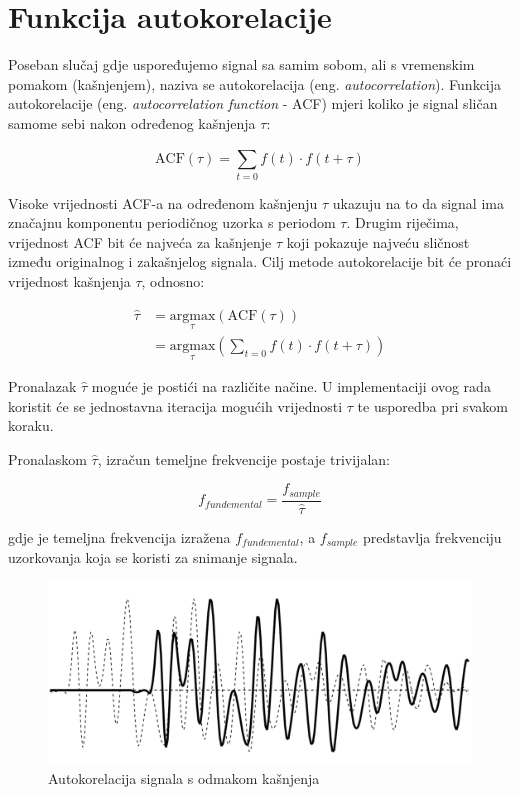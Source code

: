 \documentclass[times, utf8, diplomski, numeric]{fer}
\begin{document}
\section{Funkcija autokorelacije}
Poseban slučaj gdje uspoređujemo signal sa samim sobom, ali s vremenskim pomakom (kašnjenjem), naziva se autokorelacija (eng. \textit{autocorrelation}). Funkcija autokorelacije (eng. \textit{autocorrelation function} - ACF) mjeri koliko je signal sličan samome sebi nakon određenog kašnjenja $\tau$:

\begin{equation}
	\mathrm{ACF}(\tau) = \sum_{t = 0}^{} {f(t) \cdot f(t + \tau)}
\end{equation}

Visoke vrijednosti ACF-a na određenom kašnjenju $\tau$ ukazuju na to da signal ima značajnu komponentu periodičnog uzorka s periodom $\tau$. Drugim riječima, vrijednost ACF bit će najveća za kašnjenje $\tau$ koji pokazuje najveću sličnost između originalnog i zakašnjelog signala. Cilj metode autokorelacije bit će pronaći vrijednost kašnjenja $\tau$, odnosno:

\begin{equation}
	\begin{split}
		\hat{\tau} &= \underset{\tau}{\mathrm{argmax}} (\mathrm{ACF}(\tau)) \\
		&= \underset{\tau}{\mathrm{argmax}} (\sum_{t = 0}^{} {f(t) \cdot f(t + \tau)})
	\end{split}
\end{equation}

Pronalazak $\hat{\tau}$ moguće je postići na različite načine. U implementaciji ovog rada koristit će se jednostavna iteracija mogućih vrijednosti $\tau$ te usporedba pri svakom koraku. 

Pronalaskom $\hat{\tau}$, izračun temeljne frekvencije postaje trivijalan:

\begin{equation}
	f_{fundemental} = \frac{f_{sample}}{\hat{\tau}}
\end{equation}

gdje je temeljna frekvencija izražena $f_{fundemental}$, a $f_{sample}$ predstavlja frekvenciju uzorkovanja koja se koristi za snimanje signala.

\begin{figure}[H]
	\centerline{\includegraphics[width=1.0\textwidth]{autocorrelation.png}}
	\caption{Autokorelacija signala s odmakom kašnjenja}
	\label{fig}
\end{figure}
\end{document}
